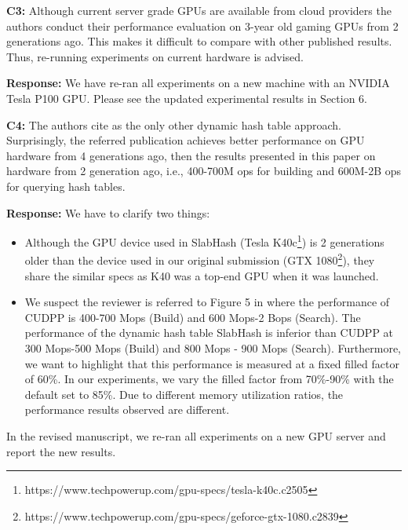 \begin{shaded}
	\noindent\textbf{C3:} Although current server grade GPUs are available from cloud providers the authors conduct their performance evaluation on 3-year old gaming GPUs from 2 generations ago. This makes it difficult to compare with other published results. Thus, re-running experiments on current hardware is advised.
\end{shaded}
%
\noindent\textbf{Response:} 
We have re-ran all experiments on a new machine with an NVIDIA Tesla P100 GPU. Please see the updated experimental results in Section 6.

\begin{shaded}
	\noindent\textbf{C4:} The authors cite \cite{ashkiani2018dynamic} as the only other dynamic hash table approach. Surprisingly, the referred publication achieves better performance on GPU hardware from 4 generations ago, then the results presented in this paper on hardware from 2 generation ago, i.e., 400-700M ops for building and 600M-2B ops for querying hash tables.
\end{shaded}
%
\noindent\textbf{Response:} 
We have to clarify two things: 
\begin{itemize}[noitemsep]
	\item Although the GPU device used in SlabHash \cite{ashkiani2018dynamic} (Tesla K40c\footnote{https://www.techpowerup.com/gpu-specs/tesla-k40c.c2505}) is 2 generations older than the device used in our original submission (GTX 1080\footnote{https://www.techpowerup.com/gpu-specs/geforce-gtx-1080.c2839}), they share the similar specs as K40 was a top-end GPU when it was launched. 
	\item We suspect the reviewer is referred to Figure 5 in \cite{ashkiani2018dynamic} where the performance of CUDPP is 400-700 Mops (Build) and 600 Mops-2 Bops (Search). The performance of the dynamic hash table SlabHash is inferior than CUDPP at 300 Mops-500 Mops (Build) and 800 Mops - 900 Mops (Search). Furthermore, we want to highlight that this performance is measured at a fixed filled factor of 60\%. In our experiments, we vary the filled factor from 70\%-90\% with the default set to 85\%. Due to different memory utilization ratios, the performance results observed are different.
\end{itemize}
%
In the revised manuscript, we re-ran all experiments on a new GPU server and report the new results.

